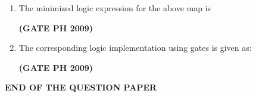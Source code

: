 \documentclass[14pt, a4paper]{extarticle}
\begin{document}
\begin{enumerate}[label=\textbf{Q. \arabic*}, start=59]

\item The minimized logic expression for the above map is
    \begin{enumerate}
    \end{enumerate}
    \hfill \textbf{(GATE PH 2009)}

\item The corresponding logic implementation using gates is given as:
    \begin{enumerate}
    \end{enumerate}
    \hfill \textbf{(GATE PH 2009)}

\end{enumerate}

\begin{center}
    \Large\textbf{END OF THE QUESTION PAPER}
\end{center}
\end{document}
